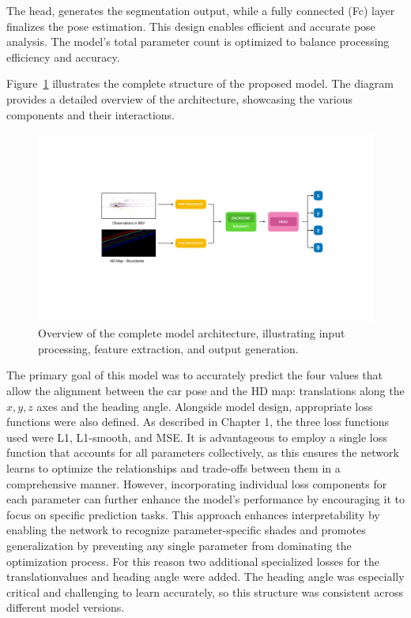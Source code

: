 The head, generates the segmentation output, while a fully connected (Fc) layer finalizes the pose estimation. This design enables efficient and accurate pose analysis. The model’s total parameter count is optimized to balance processing efficiency and accuracy.

Figure~\ref{fig:model1} illustrates the complete structure of the proposed model. The diagram provides a detailed overview of the architecture, showcasing the various components and their interactions. 
\begin{figure}[H]
    \centering
    \includegraphics[width=1\linewidth]{LateX//figs/architecture1.pdf}
    \caption{Overview of the complete model architecture, illustrating input processing, feature extraction, and output generation.}
    \label{fig:model1}
\end{figure}

The primary goal of this model was to accurately predict the four values that allow the alignment between the car pose and the HD map: translations along the \( x, y, z \) axes and the heading angle. Alongside model design, appropriate loss functions were also defined. As described in Chapter 1, the three loss functions used were L1, L1-smooth, and MSE.
It is advantageous to employ a single loss function that accounts for all parameters collectively, as this ensures the network learns to optimize the relationships and trade-offs between them in a comprehensive manner. However, incorporating individual loss components for each parameter can further enhance the model's performance by encouraging it to focus on specific prediction tasks. This approach enhances interpretability by enabling the network to recognize parameter-specific shades and promotes generalization by preventing any single parameter from dominating the optimization process. For this reason two additional specialized losses for the translationvalues and heading angle were added. 
The heading angle was especially critical and challenging to learn accurately, so this structure was consistent across different model versions.

